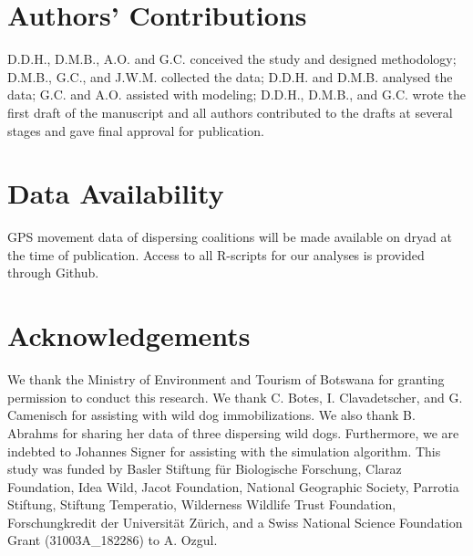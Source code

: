 \documentclass[abstract=on,10pt,a4paper,bibliography=totocnumbered]{article}
\begin{document}


\section{Authors' Contributions}
D.D.H., D.M.B., A.O. and G.C. conceived the study and designed methodology;
D.M.B., G.C., and J.W.M. collected the data; D.D.H. and D.M.B. analysed the
data; G.C. and A.O. assisted with modeling; D.D.H., D.M.B., and G.C. wrote the
first draft of the manuscript and all authors contributed to the drafts at
several stages and gave final approval for publication.

\section{Data Availability}
GPS movement data of dispersing coalitions will be made available on dryad at
the time of publication. Access to all R-scripts for our analyses is provided
through Github.

\section{Acknowledgements}
We thank the Ministry of Environment and Tourism of Botswana for granting
permission to conduct this research. We thank C. Botes, I. Clavadetscher, and G.
Camenisch for assisting with wild dog immobilizations. We also thank B. Abrahms
for sharing her data of three dispersing wild dogs. Furthermore, we are indebted
to Johannes Signer for assisting with the simulation algorithm. This study was
funded by Basler Stiftung für Biologische Forschung, Claraz Foundation, Idea
Wild, Jacot Foundation, National Geographic Society, Parrotia Stiftung, Stiftung
Temperatio, Wilderness Wildlife Trust Foundation, Forschungkredit der
Universität Zürich, and a Swiss National Science Foundation Grant
(31003A\_182286) to A. Ozgul.

\newpage
\begingroup
\singlespacing

\endgroup
\end{document}
